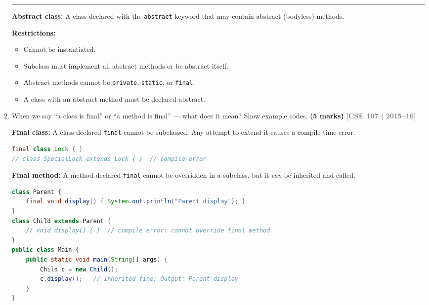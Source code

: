 \documentclass[12pt,a3paper]{article}
\newcommand{\yr}[1]{\hfill\textcolor{gray}{\small\textbf{[#1]}}}
\newcommand{\mk}[1]{\textcolor{orange!70!black}{\small\textbf{(#1 marks)}}}
\begin{document}
\begin{enumerate}
\begin{tcolorbox}
\medskip
\textcolor{cD}{\rule{\textwidth}{0.4pt}}

\textbf{Abstract class:} A class declared with the \texttt{abstract}
keyword that may contain abstract (bodyless) methods.

\textbf{Restrictions:}
\begin{itemize}[itemsep=2pt]
  \item Cannot be instantiated.
  \item Subclass must implement all abstract methods or be abstract itself.
  \item Abstract methods cannot be \texttt{private}, \texttt{static}, or \texttt{final}.
  \item A class with an abstract method must be declared abstract.
\end{itemize}

\end{tcolorbox}







\item When we say ``a class is final'' or ``a method is final'' --- what does it mean? Show example codes. \mk{5}
\yr{CSE 107 | 2015--16}

\begin{tcolorbox}[enhanced,breakable,ansbox,
  colback=cD!4,colframe=cD,boxrule=0.8pt,arc=5pt,
  title={\textbf{Answer --- Meaning of \texttt{final} Class and \texttt{final} Method}},
  fonttitle=\bfseries\color{white},colbacktitle=cD]

\textbf{Final class:} A class declared \texttt{final} cannot be
subclassed.  Any attempt to extend it causes a compile-time error.

\begin{lstlisting}[language=Java]
final class Lock { }
// class SpecialLock extends Lock { }  // compile error
\end{lstlisting}

\textbf{Final method:} A method declared \texttt{final} cannot be
overridden in a subclass, but it \emph{can} be inherited and called.

\begin{lstlisting}[language=Java]
class Parent {
    final void display() { System.out.println("Parent display"); }
}
class Child extends Parent {
    // void display() { }  // compile error: cannot override final method
}
public class Main {
    public static void main(String[] args) {
        Child c = new Child();
        c.display();   // inherited fine; Output: Parent display
    }
}
\end{lstlisting}


\end{tcolorbox}
\end{enumerate}
\end{document}
